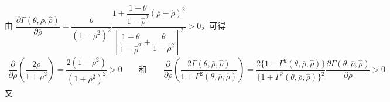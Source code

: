 \documentclass[10.0pt]{article}
\begin{document}
由 {\footnotesize $ \dfrac{\partial \Gamma (\theta, \overline{\rho}, {\hat \rho})}{\partial \overline{\rho}} = \dfrac{\theta}{(1 - \overline{\rho}^2)^2} \dfrac{1 + \dfrac{1 - \theta}{1 - {\hat \rho}^2} (\overline{\rho} - \hat{\rho})^2}{\left[ \dfrac{1 - \theta}{1 - {\hat \rho}^2} + \dfrac{\theta}{1 - \overline{\rho}^2} \right]^2} > 0 $}，可得
{\footnotesize \begin{eqnarray*}
\dfrac{\partial}{\partial \overline{\rho}} \left( \dfrac{2 \overline{\rho}}{1 + \overline{\rho}^2} \right) = \dfrac{2 (1 - \overline{\rho}^2)}{(1 + \overline{\rho}^2)^2} > 0 \qquad \text{和} \qquad \dfrac{\partial}{\partial \overline{\rho}} \left( \dfrac{2 \Gamma (\theta, \overline{\rho}, {\hat \rho})}{1 + \Gamma^2 (\theta, \overline{\rho}, {\hat \rho})} \right) = \dfrac{2 \{ 1 - \Gamma^2 (\theta, \overline{\rho}, {\hat \rho}) \}}{\{ 1 + \Gamma^2 (\theta, \overline{\rho}, {\hat \rho}) \}^2} \dfrac{\partial \Gamma (\theta, \overline{\rho}, {\hat \rho})}{\partial \overline{\rho}} > 0
\end{eqnarray*}}
 又
\end{document}
